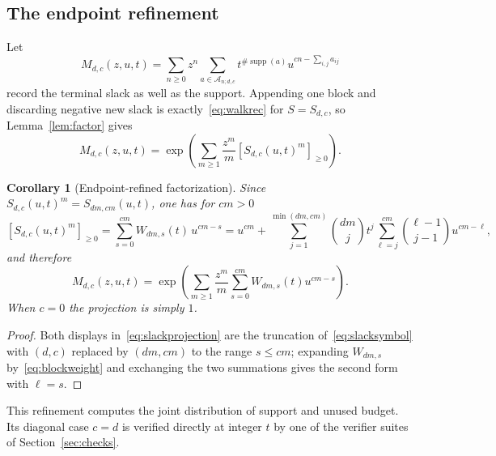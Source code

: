 \documentclass[11pt]{article}
\numberwithin{equation}{section}
\newtheorem{corollary}[theorem]{Corollary}
\theoremstyle{definition}
\newcommand{\supp}{\operatorname{supp}}
\newcommand{\pos}[1]{\left[#1\right]_{\geq0}}
\begin{document}
\subsection{The endpoint refinement}
Let
\[
 M_{d,c}(z,u,t)=\sum_{n\geq0}z^n\sum_{a\in\mathcal A_{n;d,c}}
     t^{\#\supp(a)}u^{cn-\sum_{i,j}a_{ij}}
\]
record the terminal slack as well as the support. Appending one block and
discarding negative new slack is exactly~\eqref{eq:walkrec} for
$S=S_{d,c}$, so Lemma~\ref{lem:factor} gives
\begin{equation}
 M_{d,c}(z,u,t)
 =\exp\left(\sum_{m\geq1}\frac{z^m}{m}\pos{S_{d,c}(u,t)^m}\right).
 \label{eq:slackgf}
\end{equation}

\begin{corollary}[Endpoint-refined factorization]
\label{cor:endpoint}
Since $S_{d,c}(u,t)^m=S_{dm,cm}(u,t)$, one has for $cm>0$
\begin{equation}
 \pos{S_{d,c}(u,t)^m}
 =\sum_{s=0}^{cm}W_{dm,s}(t)\,u^{cm-s}
 =u^{cm}+\sum_{j=1}^{\min(dm,cm)}\binom{dm}{j}t^j
       \sum_{\ell=j}^{cm}\binom{\ell-1}{j-1}u^{cm-\ell},
 \label{eq:slackprojection}
\end{equation}
and therefore
\begin{equation}
 M_{d,c}(z,u,t)=\exp\left(\sum_{m\geq1}\frac{z^m}{m}
       \sum_{s=0}^{cm}W_{dm,s}(t)u^{cm-s}\right).
 \label{eq:endpointfactor}
\end{equation}
When $c=0$ the projection is simply $1$.
\end{corollary}
\begin{proof}
Both displays in~\eqref{eq:slackprojection} are the truncation
of~\eqref{eq:slacksymbol} with $(d,c)$ replaced by $(dm,cm)$ to the range
$s\leq cm$; expanding $W_{dm,s}$ by~\eqref{eq:blockweight} and exchanging the
two summations gives the second form with $\ell=s$.
\end{proof}

This refinement computes the joint distribution of support and unused budget.
Its diagonal case $c=d$ is verified directly at integer $t$ by one of the
verifier suites of Section~\ref{sec:checks}.
\end{document}
